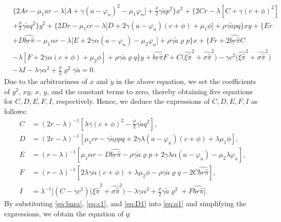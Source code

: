 \documentclass[11pt]{article}
\newcommand \varp {\varphi}
\numberwithin{equation}{section}
\begin{document}
	\begin{align}
		&\Big\{2Ar-\mu_1ar -\lambda\Big[A+\gamma(a-\varphi_n)^2-\mu_1 \varphi_n\Big]+\frac{\rho}{2}\gamma  \tilde{a}p^2\Big\}x^2+\Big\{2Cr-\lambda [ C+\gamma(c+\phi)^2 ]\\	
		&+\frac{\rho}{2}\gamma \tilde{a}q^2\Big\}y^2+\Big\{2Dr-\mu_1cr-\lambda\Big[D+2\gamma(a-\varphi_n)(c+\phi)+\mu_1{\phi} \Big] +\rho\gamma \tilde{a}pq\Big\}xy+\Big\{ Er\\	
		&+D\widehat{\underline{br}\widehat{\pi}}-\mu_1\alpha r-\lambda\Big[ E+2\gamma \alpha(a-\varphi_n)-\mu_2\varphi_n\Big]+\rho \gamma \tilde{a}\varrho p\Big\}x+\Big\{Fr+2\widehat{\underline{br}\widehat{\pi}}C\\	
		&-\lambda[F+2\gamma \alpha(c+\phi)+\mu_2\phi]+\rho \gamma \tilde{a}\varrho q\Big\}y+ \widehat{\underline{br}\widehat{\pi}}F +C\Big(\widehat{\xi\widehat{\pi}}^2+\widehat{\sigma\widehat{\pi}}^2\Big)-\gamma c^2\Big(\widehat{\xi\widehat{\pi}}^2+\widehat{\sigma\widehat{\pi}}^2\Big)\\	
		&-\lambda I-\lambda\gamma \alpha^2+\frac{\rho}{2}\varrho^2\gamma \tilde{a}=0.	\label{eq:EHJB3}	
	\end{align}
	Due to the arbitrariness of \(x\) and \(y\) in the above equation, we set the coefficients of $y^2$, \(xy\), $x$, $y$, and the constant terms to zero, thereby obtaining five equations for \(C, D, E, F, I\), respectively. Hence, we deduce the expressions of \(C, D, E, F, I\) as follows: \begin{align}
		C &=(2r-\lambda)^{-1}[\lambda\gamma(c+\phi)^2-\frac{\rho}{2}\gamma \tilde{a}q^2], \label{eq:C1} \\
		D &=(2r-\lambda)^{-1}[\mu_1 cr-\gamma  \tilde{a}\rho pq+2\gamma \lambda(a-{\varphi}_{n})(c+\phi)+\lambda\mu_1\phi], \label{eq:D1} \\
		E &=(r-\lambda)^{-1}[\mu_1\alpha r-D\widehat{\underline{br}\widehat{\pi}}-\rho\gamma  \tilde{a}\varrho p+2\gamma\lambda \alpha (a-{\varphi}_{n})-\mu_2\lambda \varp_n],\label{eq:E1} \\
		F &=(r-\lambda)^{-1}[ 2\lambda\gamma \alpha(c+\phi)+\lambda\mu_2\phi-\rho\gamma \tilde{a}\varrho   q-2C\widehat{\underline{br}\widehat{\pi}}], \label{eq:F1} \\
		I &=\lambda^{-1}\Big[(C-\gamma c^2)\Big(\widehat{\xi\widehat{\pi}}^2+\widehat{\sigma\widehat{\pi}}^2\Big)-\lambda \gamma \alpha^2+\frac{\rho}{2}\gamma \tilde{a}\varrho^2+F\widehat{\underline{br}\widehat{\pi}}\Big]. \label{eq:I1}
	\end{align}
	By substituting \eqref{eq:bara}, \eqref{eq:c1}, and \eqref{eq:D1} into \eqref{eq:q1} and simplifying the expressions, we obtain the equation of \(q\):
\end{document}
